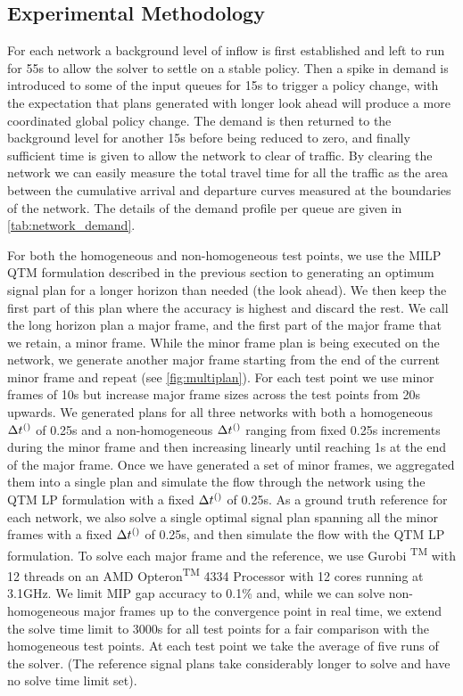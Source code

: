 \subsection{Experimental Methodology}
For each network a background level of inflow is first established and left to run 
for 55s to allow the solver to settle on a stable policy. Then a spike in demand is 
introduced to some of the input 
queues for 15s to trigger a policy change, with the expectation that plans 
generated with longer look ahead will produce a more coordinated global policy 
change. The demand is then returned to the 
background level for another 15s before being reduced to zero, and finally 
sufficient time is given to allow the network to clear of traffic. By clearing the 
network we can easily measure the total travel 
time for all the traffic as the area between the cumulative arrival and departure 
curves measured at the boundaries of the network. The details of the demand 
profile per queue are given in 
\cref{tab:network_demand}.

For both the homogeneous and non-homogeneous test points,
we use the MILP QTM formulation described in the previous section to 
generating an optimum signal plan for a longer horizon than needed (the look 
ahead). We then keep the
first part of this plan where the accuracy is highest and discard the
rest. We call the long horizon plan a major frame, and the first part of the major 
frame that we retain, a minor frame. While the minor frame
plan is being executed on the network, we generate another major frame 
starting from the end of the current minor frame and
repeat (see \cref{fig:multiplan}). For each test point we use minor frames of 10s 
but increase major frame sizes across the test points from 20s upwards. We 
generated plans for all three networks with 
both a homogeneous $\DT[]$ of 0.25s
and a non-homogeneous $\DT[]$ ranging from fixed 0.25s increments
during the minor frame and then increasing linearly until reaching 1s at
the end of the major frame. Once we have generated a set of minor
frames, we aggregated them into a single plan and simulate the flow through 
the network using the QTM LP formulation with a fixed $\DT[]$ of 
0.25s. As a ground truth reference for each network, we also solve a single 
optimal signal plan spanning all the minor frames with a fixed $\DT[]$ of 0.25s, 
and then simulate the flow with the QTM LP formulation. 
To solve each major frame and the reference, we use Gurobi
\textsuperscript{TM} with 12 threads on an AMD Opteron\textsuperscript{TM} 
4334 Processor with 12 cores running at 3.1GHz. We limit MIP gap accuracy to 
0.1\% and, while we can solve non-
homogeneous major frames up to the convergence point in real time, we 
extend the solve time limit to 3000s for all test points for a fair comparison with 
the homogeneous test points. At each test 
point we take the average of five runs of the solver. (The reference signal plans 
take considerably longer to solve and have no solve time limit set).

